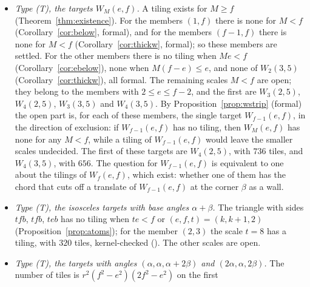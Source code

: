 \documentclass[11pt,reqno]{amsart}
\theoremstyle{plain}
\theoremstyle{definition}
\begin{document}
\begin{itemize}
every tiling of $T_f(1,f)$ has a wall from the apex along a cevian of length at least $(f-1)f(f^2-1)$; the tilings of
$T_f(1,f)$ exist, so this form of the question can be tested.
For $e\ge2$ the first of these two statements holds as well, with the attached copy at scale $Me$
(Proposition~\ref{prop:layerall}, formal), but the reduction to a single scale does not. The layer of
Proposition~\ref{prop:layerall} has the height of $T_e(e,f)$ and relates the scales $M$ and $M+e$; it relates
two scales below $f$ only for the members with $(f-e)^2\ge2f$. For the members $(f-1,f)$ it exists only at the
scales $M\ge f$, so their open scales are not reduced: each scale $2\le M<f$ is a separate case, apart from
$T_2(2,3)$ and $T_2(3,4)$, and the first open one is $T_3(3,4)$.
\item \emph{Type \textup{(T)}, the targets $W_M(e,f)$.} A tiling exists for $M\ge f$
(Theorem~\ref{thm:existence}). For the members $(1,f)$ there is none for $M<f$ (Corollary~\ref{cor:below},
formal), and for the members $(f-1,f)$ there is none for $M<f$ (Corollary~\ref{cor:thickw}, formal); so these
members are settled. For the other members there is no tiling when $Me<f$ (Corollary~\ref{cor:ebelow}), none when
$M(f-e)\le e$, and none of $W_2(3,5)$ (Corollary~\ref{cor:thickw}), all formal. The remaining scales $M<f$ are open; they belong to the members with
$2\le e\le f-2$, and the first are $W_3(2,5)$, $W_4(2,5)$, $W_3(3,5)$ and $W_4(3,5)$. By
Proposition~\ref{prop:wstrip} (formal) the open part is, for each of these members, the single target
$W_{f-1}(e,f)$, in the direction of exclusion: if $W_{f-1}(e,f)$ has no tiling, then $W_M(e,f)$ has none for
any $M<f$, while a tiling of $W_{f-1}(e,f)$ would leave the smaller scales undecided. The first of these
targets are $W_4(2,5)$, with $736$ tiles, and $W_4(3,5)$, with $656$. The question for $W_{f-1}(e,f)$ is
equivalent to one about the tilings of $W_f(e,f)$, which exist: whether one of them has the chord that cuts
off a translate of $W_{f-1}(e,f)$ at the corner $\beta$ as a wall.
\item \emph{Type \textup{(T)}, the isosceles targets with base angles $\alpha+\beta$.} The triangle with
sides $tfb$, $tfb$, $teb$ has no tiling when $te<f$ or $(e,f,t)=(k,k+1,2)$ (Proposition~\ref{prop:atoms});
for the member $(2,3)$ the scale $t=8$ has a tiling, with $320$ tiles, kernel-checked
(). The other scales are open.
\item \emph{Type \textup{(T)}, the targets with angles $(\alpha,\alpha,\alpha+2\beta)$ and
$(2\alpha,\alpha,2\beta)$.} The number of tiles is $r^2(f^2-e^2)(2f^2-e^2)$ on the first

\end{itemize}
\end{document}

